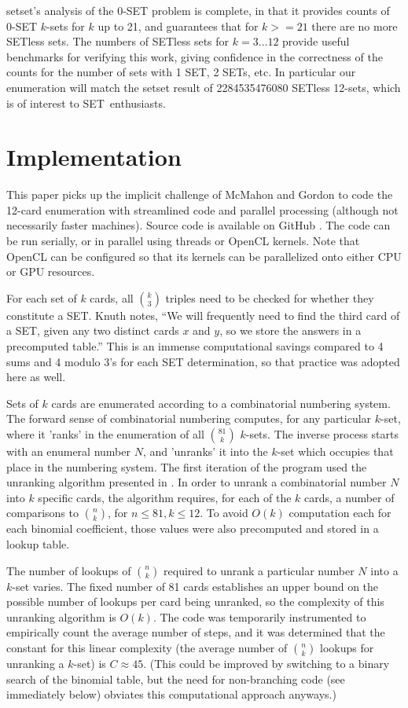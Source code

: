 \documentclass[10pt]{amsart}
\newcommand{\SETb}{SET\texttrademark\ } %
\newcommand{\SETSET}{{\sc setset}}
\newcommand{\SETSETb}{{\sc setset }}
\begin{document}
\SETSET's analysis of the 0-SET problem is complete, in that it provides counts
of 0-SET $k$-sets for $k$ up to 21, and \cite{MAXCAP} guarantees that for
$k>=21$ there are no more SETless sets. The numbers of SETless sets for
$k=3\ldots 12$ provide useful benchmarks for verifying this work, giving
confidence in the correctness of the counts for the number of sets with 1 SET, 2
SETs, etc. In particular our enumeration will match the \SETSETb result of
2284535476080 SETless 12-sets, which is of interest to \SETb enthusiasts.


\section{Implementation}
This paper picks up the implicit challenge of McMahon and Gordon to code the
12-card enumeration with streamlined code and parallel processing (although not
necessarily faster machines). Source code is available on GitHub \cite{ME}. The
code can be run serially, or in parallel using threads or OpenCL \cite{OPENCL}
kernels. Note that OpenCL can be configured so that its kernels can be
parallelized onto either CPU or GPU resources.

For each set of $k$ cards, all $\binom{k}{3}$ triples need to be checked for
whether they constitute a SET. Knuth notes, ``We will frequently need to find
the third card of a SET, given any two distinct cards $x$ and $y$, so we store
the answers in a precomputed table.''  This is an immense computational savings
compared to 4 sums and 4 modulo 3's for each SET determination, so that practice
was adopted here as well.

Sets of $k$ cards are enumerated according to a combinatorial numbering
system. The forward sense of combinatorial numbering computes, for any
particular $k$-set, where it 'ranks' in the enumeration of all $\binom{81}{k}$
$k$-sets. The inverse process starts with an enumeral number $N$, and 'unranks'
it into the $k$-set which occupies that place in the numbering system. The first
iteration of the program used the unranking algorithm presented in
\cite{WIKI}. In order to unrank a combinatorial number $N$ into $k$ specific
cards, the algorithm requires, for each of the $k$ cards, a number of
comparisons to $\binom{n}{k}$, for $n\le 81, k\le 12$. To avoid $O(k)$
computation each for each binomial coefficient, those values were also
precomputed and stored in a lookup table.

The number of lookups of $\binom{n}{k}$ required to unrank a particular number
$N$ into a $k$-set varies. The fixed number of 81 cards establishes an upper
bound on the possible number of lookups per card being unranked, so the
complexity of this unranking algorithm is $O(k)$. The code was temporarily
instrumented to empirically count the average number of steps, and it was
determined that the constant for this linear complexity (the average number of
$\binom{n}{k}$ lookups for unranking a $k$-set) is $C\approx 45$. (This could be
improved by switching to a binary search of the binomial table, but the need for
non-branching code (see immediately below) obviates this computational approach
anyways.)
\end{document}
